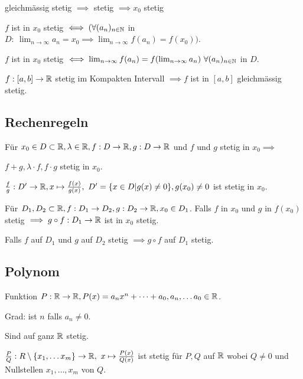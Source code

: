 \begin{compactitem}
    \item gleichmässig stetig $\implies$ stetig $\implies x_0$ stetig
    \item $f$ ist in $x_0$ stetig $\iff (\forall (a_n)_{n \in \mathbb{N}}$ in $D: \ \lim_{n \to \infty} a_n = x_0 \implies \lim_{n \to \infty} f(a_n) = f(x_0))$.
        \begin{compactitem}
            \item $f$ ist in $x_0$ stetig $\iff \lim_{n \to \infty} f(a_n) = f( \lim_{n \to \infty} a_n) \ \forall (a_n)_{n \in \mathbb{N}}$ in $D$.
        \end{compactitem}
    \item $f: [a, b] \to \mathbb{R}$ stetig im Kompakten Intervall $\implies f$ ist in $[a,b]$ gleichmässig stetig.
\end{compactitem}

\subsection{Rechenregeln}
Für $x_0 \in D \subset \mathbb{R}, \lambda \in \mathbb{R}, f: D \to \mathbb{R}, g: D \to \mathbb{R}$ und $f$ und $g$ stetig in $x_0 \implies$
\begin{compactenum}
    \item $f + g, \lambda \cdot f, f \cdot g$ stetig in $x_0$.
    \item $\frac{f}{g}: D' \to \mathbb{R}, x \mapsto \frac{f(x)}{g(x)}, \ D' = \{x \in D | g(x) \neq 0\}, g(x_0) \neq 0$ ist stetig in $x_0$.
\end{compactenum}
Für $D_1, D_2 \subset \mathbb{R}, f: D_1 \to D_2, g: D_2 \to \mathbb{R}, x_0 \in D_1$. Falls $f$ in $x_0$ und $g$ in $f(x_0)$ stetig $\implies g \circ f : D_1 \to \mathbb{R}$ ist in $x_0$ stetig.
\begin{compactitem}
    \item Falls $f$ auf $D_1$ und $g$ auf $D_2$ stetig $\implies g \circ f$ auf $D_1$ stetig.
\end{compactitem}

\subsection{Polynom}
Funktion $P: \mathbb{R} \to \mathbb{R}, P(x)= a_nx^n + \dots + a_0, a_n, \dots a_0 \in \mathbb{R}$.
\begin{compactdesc}
    \item[Grad:] ist $n$ falls $a_n \neq 0$.
\end{compactdesc}
\begin{compactitem}
    \item Sind auf ganz $\mathbb{R}$ stetig.
    \item $\frac{P}{Q}: R \setminus \{x_1, \dots x_m\}  \to \mathbb{R}, \ x \mapsto \frac{P(x)}{Q(x)}$ ist stetig für $P,Q$ auf $\mathbb{R}$ wobei $ Q \neq 0$  und Nullstellen $x_1, \dots, x_m$ von $Q$.
\end{compactitem}

